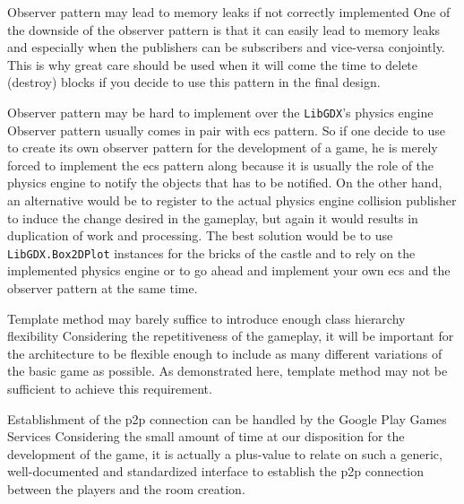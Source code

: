 \begin{description}[style=nextline]
  \item[R3\label{r3}] Observer pattern may lead to memory leaks if not correctly implemented
    \vspace{\baselineskip}
    \newline
    One of the downside of the observer pattern is that it can easily lead to memory leaks and especially when the publishers can be subscribers and vice-versa conjointly. This is why great care should be used when it will come the time to delete (destroy) blocks if you decide to use this pattern in the final design. \cite{wiki:observer}

  \item[R4\label{r4}] Observer pattern may be hard to implement over the \texttt{LibGDX}'s physics engine
    \vspace{\baselineskip}
    \newline
    Observer pattern usually comes in pair with \gls{ecs} pattern. So if one decide to use to create its own observer pattern for the development of a game, he is merely forced to implement the \gls{ecs} pattern along because it is usually the role of the physics engine to notify the objects that has to be notified. On the other hand, an alternative would be to register to the actual physics engine collision publisher to induce the change desired in the gameplay, but again it would results in duplication of work and processing. The best solution would be to use \texttt{LibGDX.Box2DPlot} instances for the bricks of the castle and to rely on the implemented physics engine or to go ahead and implement your own \gls{ecs} and the observer pattern at the same time. 

  \item[R5\label{r5}] Template method may barely suffice to introduce enough class hierarchy flexibility
    \vspace{\baselineskip}
    \newline
    Considering the repetitiveness of the gameplay, it will be important for the architecture to be flexible enough to include as many different variations of the basic game as possible. As demonstrated here, template method may not be sufficient to achieve this requirement.

\end{description}

\begin{description}[style=nextline]
  \item[N1\label{n1}] Establishment of the \gls{p2p} connection can be handled by the Google Play Games Services
  \vspace{\baselineskip}
  \newline
  Considering the small amount of time at our disposition for the development of the game, it is actually a plus-value to relate on such a generic, well-documented and standardized interface to establish the \gls{p2p} connection between the players and the room creation.

\end{description}
